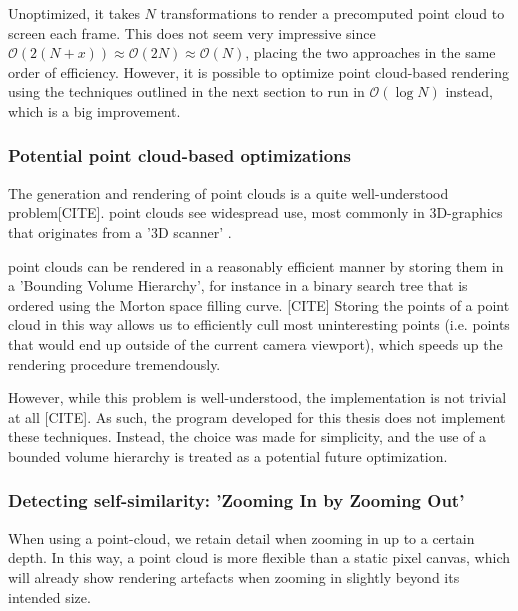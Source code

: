 \documentclass[11pt]{article}
\begin{document}
Unoptimized, it takes \(N\) transformations to render a precomputed point cloud to screen each frame.
This does not seem very impressive since \(\mathcal{O}(2(N+x)) \approx \mathcal{O}(2N) \approx \mathcal{O}(N)\),
placing the two approaches in the same order of efficiency. However, it is possible to optimize point cloud-based rendering using the techniques outlined in the next section
to run in \(\mathcal{O}(\log{N})\) instead, which is a big improvement.

\subsubsection{Potential point cloud-based optimizations}
\label{sec:org50383e6}
\label{subsection:point_cloud_optimizations}

The generation and rendering of point clouds is a quite well-understood problem[CITE]. point clouds see widespread use,
most commonly in 3D-graphics that originates from a '3D scanner' .

point clouds can be rendered in a reasonably efficient manner by storing them in a 'Bounding Volume Hierarchy',
for instance in a binary search tree that is ordered using the Morton space filling curve. [CITE]
Storing the points of a point cloud in this way allows us to efficiently cull most uninteresting points (i.e. points that would end up outside of the current camera viewport),
which speeds up the rendering procedure tremendously.

However, while this problem is well-understood, the implementation is not trivial at all [CITE].
As such, the program developed for this thesis does not implement these techniques.
Instead, the choice was made for simplicity, 
and the use of a bounded volume hierarchy is treated as a potential future optimization.


\subsubsection{Detecting self-similarity: 'Zooming In by Zooming Out'}
\label{sec:org1f7469f}
\label{subsection:self_similarity}

When using a point-cloud, we retain detail when zooming in up to a certain depth. In this way, a point cloud is more flexible than a 
static pixel canvas, which will already show rendering artefacts when zooming in slightly beyond its intended size.
\end{document}
